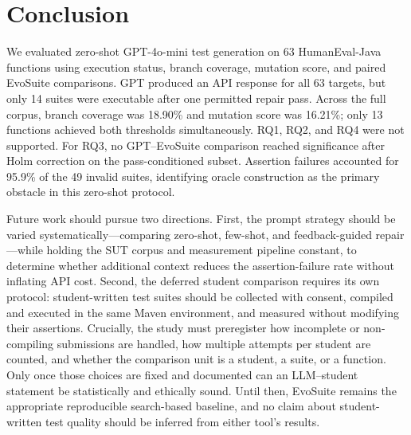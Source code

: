 \section{Conclusion}
\label{sec:conclusion}

We evaluated zero-shot GPT-4o-mini test generation on 63 HumanEval-Java functions using execution status, branch coverage, mutation score, and paired EvoSuite comparisons. GPT produced an API response for all 63 targets, but only 14 suites were executable after one permitted repair pass. Across the full corpus, branch coverage was 18.90\% and mutation score was 16.21\%; only 13 functions achieved both thresholds simultaneously. RQ1, RQ2, and RQ4 were not supported. For RQ3, no GPT--EvoSuite comparison reached significance after Holm correction on the pass-conditioned subset. Assertion failures accounted for 95.9\% of the 49 invalid suites, identifying oracle construction as the primary obstacle in this zero-shot protocol.

Future work should pursue two directions. First, the prompt strategy should be varied systematically---comparing zero-shot, few-shot, and feedback-guided repair---while holding the SUT corpus and measurement pipeline constant, to determine whether additional context reduces the assertion-failure rate without inflating API cost. Second, the deferred student comparison requires its own protocol: student-written test suites should be collected with consent, compiled and executed in the same Maven environment, and measured without modifying their assertions. Crucially, the study must preregister how incomplete or non-compiling submissions are handled, how multiple attempts per student are counted, and whether the comparison unit is a student, a suite, or a function. Only once those choices are fixed and documented can an LLM--student statement be statistically and ethically sound. Until then, EvoSuite remains the appropriate reproducible search-based baseline, and no claim about student-written test quality should be inferred from either tool's results.
